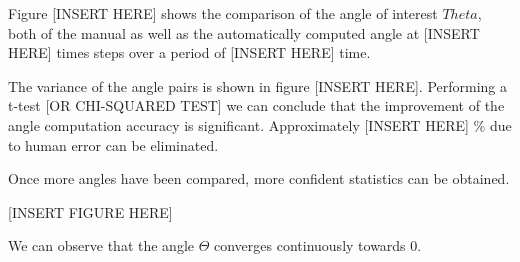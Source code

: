 Figure [INSERT HERE] shows the comparison of the angle of interest \( Theta \), both of the manual as well as the automatically computed angle at [INSERT HERE] times steps over a period of [INSERT HERE] time.

The variance of the angle pairs is shown in figure [INSERT HERE]. Performing a t-test [OR CHI-SQUARED TEST] we can conclude that the improvement of the angle computation accuracy is significant. Approximately [INSERT HERE] \% due to human error can be eliminated.

Once more angles have been compared, more confident statistics can be obtained. 

[INSERT FIGURE HERE]

We can observe that the angle \( \Theta \) converges continuously towards 0.

